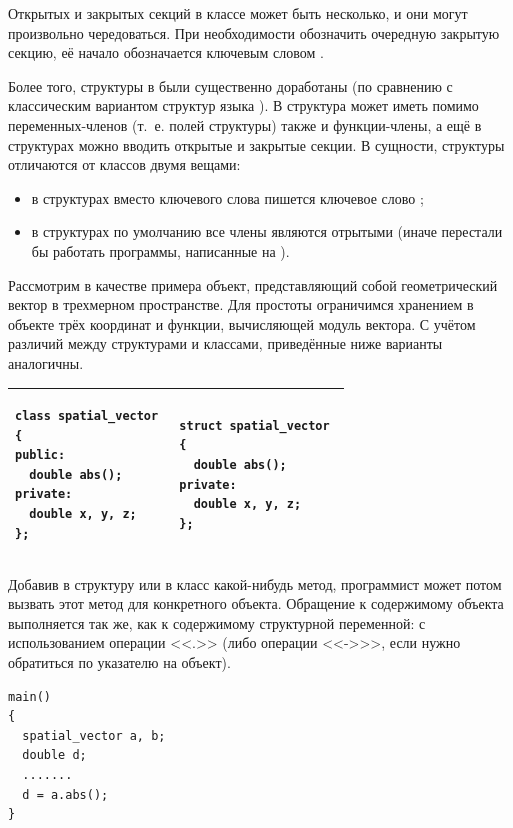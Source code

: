Открытых и закрытых секций в классе может быть несколько, и они могут произвольно чередоваться. При необходимости
обозначить очередную закрытую секцию, её начало обозначается ключевым словом .

Более того, структуры в  были существенно доработаны (по сравнению с  классическим вариантом 
структур языка ). 
В 
структура может иметь помимо переменных-членов (т.~е. полей структуры) также и функции-члены, а ещё в структурах можно
вводить открытые и закрытые секции. В сущности, структуры отличаются от классов двумя вещами:

\begin{itemize}
\item в структурах вместо ключевого слова  пишется ключевое слово
;
\item в структурах по умолчанию все члены являются отрытыми (иначе перестали бы работать программы, написанные на ). 
\end{itemize}
Рассмотрим в качестве примера объект, представляющий собой геометрический вектор в трехмерном пространстве. Для простоты
ограничимся хранением в объекте трёх координат и функции, вычисляющей модуль вектора. С учётом различий между
структурами и классами, приведённые ниже варианты аналогичны.
\begin{center}
\begin{tabular}{|p{}|p{}|}
\hline
\begin{lstlisting}
class spatial_vector 
{
public:
  double abs();
private:
  double x, y, z;
};
\end{lstlisting}
&
\begin{lstlisting}
struct spatial_vector 
{
  double abs();
private:
  double x, y, z;
};
\end{lstlisting}
\\\hline
\end{tabular}
\end{center}

Добавив в структуру или в класс какой-нибудь метод, программист может потом вызвать этот метод для конкретного объекта.
Обращение к содержимому объекта выполняется так же, как к содержимому структурной переменной: с использованием операции
<<.>> (либо операции <<->{}>>, если нужно обратиться по указателю на объект).
\begin{lstlisting}
main() 
{
  spatial_vector a, b;
  double d;
  .......
  d = a.abs();
}
\end{lstlisting}

